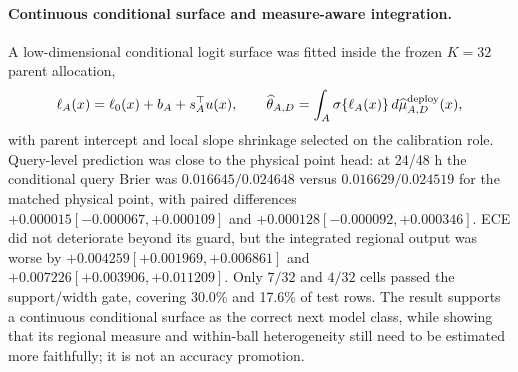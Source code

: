 \documentclass[11pt,a4paper]{article}
\numberwithin{equation}{section}
\theoremstyle{definition}\newtheorem{definition}[theorem]{Definition}
\theoremstyle{remark}\newtheorem{remark}[theorem]{Remark}
\begin{document}
\paragraph{Continuous conditional surface and measure-aware integration.}
A low-dimensional conditional logit surface was fitted inside the frozen $K=32$ parent allocation,
\[
\ell_A(x)=\ell_0(x)+b_A+s_A^{\top}u(x),\qquad
\widehat\theta_{A,D}=\int_A\sigma\{\ell_A(x)\}\,d\widehat\mu_{A,D}^{\rm deploy}(x),
\]
with parent intercept and local slope shrinkage selected on the calibration role. Query-level prediction was close to the physical point head: at 24/48 h the conditional query Brier was $0.016645/0.024648$ versus $0.016629/0.024519$ for the matched physical point, with paired differences $+0.000015[-0.000067,+0.000109]$ and $+0.000128[-0.000092,+0.000346]$. ECE did not deteriorate beyond its guard, but the integrated regional output was worse by $+0.004259[+0.001969,+0.006861]$ and $+0.007226[+0.003906,+0.011209]$. Only $7/32$ and $4/32$ cells passed the support/width gate, covering 30.0\% and 17.6\% of test rows. The result supports a continuous conditional surface as the correct next model class, while showing that its regional measure and within-ball heterogeneity still need to be estimated more faithfully; it is not an accuracy promotion.
\end{document}
